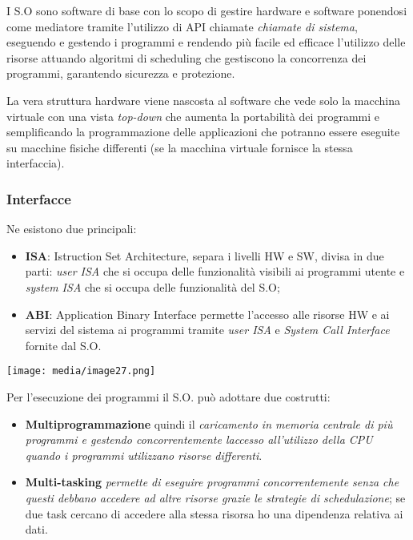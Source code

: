 I S.O sono software di base con lo scopo di gestire hardware e software
ponendosi come mediatore tramite l'utilizzo di API chiamate
\emph{chiamate di sistema}, eseguendo e gestendo i programmi e rendendo
più facile ed efficace l'utilizzo delle risorse attuando algoritmi di
scheduling che gestiscono la concorrenza dei programmi, garantendo
sicurezza e protezione.

La vera struttura hardware viene nascosta al software che vede solo la
macchina virtuale con una vista \emph{top-down} che aumenta la
portabilità dei programmi e semplificando la programmazione delle
applicazioni che potranno essere eseguite su macchine fisiche differenti
(se la macchina virtuale fornisce la stessa interfaccia).

\subsubsection{Interfacce}\label{interfacce}

Ne esistono due principali:

\begin{itemize}
\item
  \textbf{ISA}: Istruction Set Architecture, separa i livelli HW e SW,
  divisa in due parti: \emph{user ISA} che si occupa delle funzionalità
  visibili ai programmi utente e \emph{system ISA} che si occupa delle
  funzionalità del S.O;
\item
  \textbf{ABI}: Application Binary Interface permette l'accesso alle
  risorse HW e ai servizi del sistema ai programmi tramite \emph{user
  ISA} e \emph{System Call Interface} fornite dal S.O.
\end{itemize}

\texttt{[image: media/image27.png]}

Per l'esecuzione dei programmi il S.O. può adottare due costrutti:

\begin{itemize}
\item
  \textbf{Multiprogrammazione} quindi il \emph{caricamento in memoria
  centrale di più programmi e gestendo concorrentemente
  l\textquotesingle accesso all'utilizzo della CPU} \emph{quando i
  programmi utilizzano risorse differenti}.
\item
  \textbf{Multi-tasking} \emph{permette di eseguire programmi
  concorrentemente senza che questi debbano accedere ad altre risorse
  grazie le strategie di schedulazione}; se due task cercano di accedere
  alla stessa risorsa ho una dipendenza relativa ai dati.
\end{itemize}

